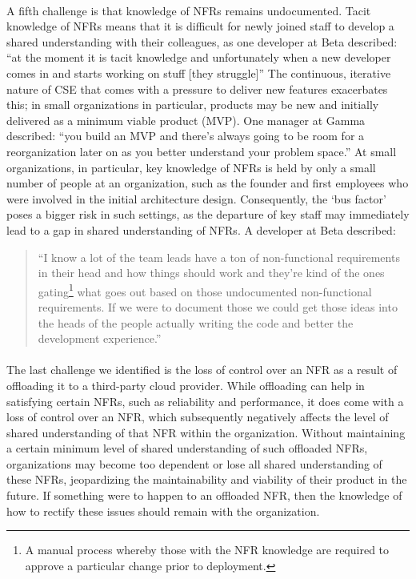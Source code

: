 \documentclass[smallextended]{svjour3}        %
\providecommand{\DIFaddtex}[1]{{\protect\color{blue}\uwave{#1}}} %
\providecommand{\DIFaddbegin}{} %
\providecommand{\DIFaddend}{} %
\providecommand{\DIFadd}[1]{\texorpdfstring{\DIFaddtex{#1}}{#1}} %
\newcommand{\DIFaddincludegraphics}[2][]{{\color{blue}\fbox{\DIFOincludegraphics[#1]{#2}}}} %
\DeclareRobustCommand{\DIFaddbegin}{\DIFOaddbegin \let\includegraphics\DIFaddincludegraphics} %
\DeclareRobustCommand{\DIFaddend}{\DIFOaddend \let\includegraphics\DIFOincludegraphics} %
\begin{document}
\DIFaddbegin \paragraph{\DIFadd{Knowledge of NFRs is not documented}} \DIFaddend A fifth challenge is that knowledge of NFRs remains undocumented. Tacit knowledge of NFRs means that it is difficult for newly joined staff to develop a shared understanding with their colleagues, as one developer at Beta described:
\textmd{``at the moment it is tacit knowledge and unfortunately when a new developer comes in and starts working on stuff [they struggle]''}
The continuous, iterative nature of CSE that comes with a pressure to deliver new features exacerbates this; in small organizations in particular, products may be new and initially delivered as a minimum viable product (MVP). One manager at Gamma described:
\textmd{``you build an MVP and there's always going to be room for a reorganization later on as you better understand your problem space.''}
At small organizations, in particular, key knowledge of NFRs is held by only a small number of people at an organization, such as the founder and first employees who were involved in the initial architecture design. Consequently, the `bus factor' poses a bigger risk in such settings, as the departure of key staff may immediately lead to a gap in shared understanding of NFRs.
A developer at Beta described:
\begin{quote}
    ``I know a lot of the team leads have a ton of non-functional requirements in their head and how things should work and they're kind of the ones gating\footnote{A manual process whereby those with the NFR knowledge are required to approve a particular change prior to deployment.} what goes out based on those undocumented non-functional requirements. If we were to document those we could get those ideas into the heads of the people actually writing the code and better the development experience.''
\end{quote}




\DIFaddbegin \paragraph{\DIFadd{Loss of control}} \DIFaddend The last challenge we identified is the loss of control over an NFR as a result of offloading it to a third-party cloud provider.
While offloading can help in satisfying certain NFRs, such as reliability and performance, it does come with a loss of control over an NFR, which subsequently negatively affects the level of shared understanding of that NFR within the organization. 
Without maintaining a certain minimum level of shared understanding of such offloaded NFRs, organizations may become too dependent or lose all shared understanding of these NFRs, jeopardizing the maintainability and viability of their product in the future. If something were to happen to an offloaded NFR, then the knowledge of how to rectify these issues should remain with the organization.
\end{document}

